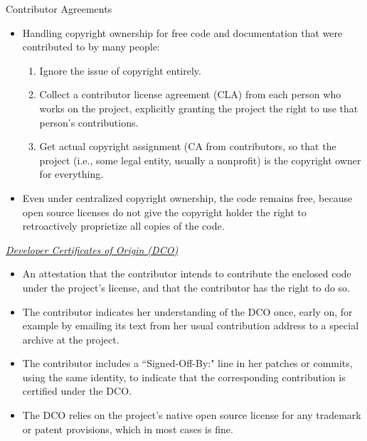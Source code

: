 \documentclass{beamer}
\begin{document}
\begin{frame}{Contributor Agreements}
\begin{itemize}
	\item Handling copyright ownership for free code and documentation that were contributed to by many people: 
	\begin{enumerate}
		\item Ignore the issue of copyright entirely. 
		\item Collect a contributor license agreement (CLA) from each person who works on the project, explicitly granting the project the right to use that person's contributions.
		\item Get actual copyright assignment (CA from contributors, so that the project (i.e., some legal entity, usually a nonprofit) is the copyright owner for everything.
	\end{enumerate}
	\item Even under centralized copyright ownership, the code remains free, because open source licenses do not give the copyright holder the right to retroactively proprietize all copies of the code.
\end{itemize}
\end{frame}

\begin{frame}{\emph {\href{http://developercertificate.org}{Developer Certificates of Origin (DCO)}}}
\begin{itemize}
	\item An attestation that the contributor intends to contribute the enclosed code under the project's license, and that the contributor has the right to do so.
	\item The contributor indicates her understanding of the DCO once, early on, for example by emailing its text from her usual contribution address to a special archive at the project.
	\item The contributor includes a ``Signed-Off-By:" line in her patches or commits, using the same identity, to indicate that the corresponding contribution is certified under the DCO.
	\item The DCO relies on the project's native open source license for any trademark or patent provisions, which in most cases is fine.
\end{itemize}
\end{frame}
\end{document}
